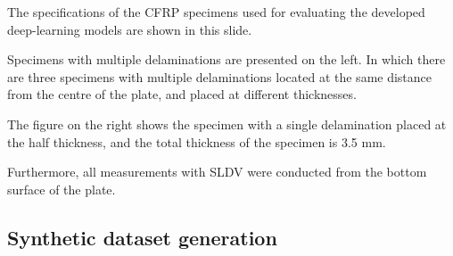 \documentclass[10pt,aspectratio=169,dvipsnames]{beamer} %
\begin{document}
	\note
	{	
		\footnotesize
		The specifications of the CFRP specimens used for evaluating the developed deep-learning models are shown in this slide.
		
		Specimens with multiple delaminations are presented on the left.
		In which there are three specimens with multiple delaminations located at the same distance from the centre of the plate, and placed at different thicknesses. 
		
		The figure on the right shows the specimen with a single delamination placed at the half thickness, and the total thickness of the specimen is 3.5 mm.
		
		Furthermore, all measurements with SLDV were conducted from the bottom surface of the plate.		
	}

	\subsection{Synthetic dataset generation}
	
\end{document}
